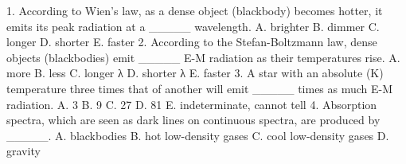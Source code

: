 





1. According to Wien’s law, as a dense object (blackbody) becomes hotter, it emits its peak
radiation at a _____ wavelength.
A. brighter
B. dimmer
C. longer
D. shorter
E. faster
2. According to the Stefan-Boltzmann law, dense objects (blackbodies) emit _____ E-M
radiation as their temperatures rise.
A. more
B. less
C. longer λ
D. shorter λ
E. faster
3. A star with an absolute (K) temperature three times that of another will emit _____ times as
much E-M radiation.
A. 3
B. 9
C. 27
D. 81
E. indeterminate, cannot tell
4. Absorption spectra, which are seen as dark lines on continuous spectra, are produced by
_____.
A. blackbodies
B. hot low-density gases
C. cool low-density gases
D. gravity


